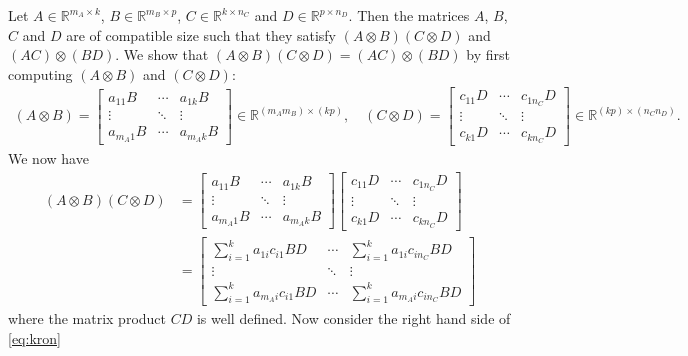 Let $A\in \mathbb{R}^{m_{A}\times k}$, $B\in \mathbb{R}^{m_B\times p}$, $C\in \mathbb{R}^{k\times n_{C}}$ and $D\in \mathbb{R}^{p\times n_{D}}$. Then the matrices $A$, $B$, $C$ and $D$ are of  compatible size such that they satisfy $(A\otimes B)(C\otimes D)$ and $(AC)\otimes (BD)$. We show that $(A\otimes B)(C\otimes D) = (AC)\otimes (BD)$ by first computing $  (A\otimes B)$ and $  (C\otimes D)$:
\begin{align*}
  (A\otimes B) = \begin{bmatrix}
a_{11}B & \cdots & a_{1k}B\\
\vdots & \ddots & \vdots\\
a_{m_{A}1}B & \cdots & a_{m_{A}k}B
\end{bmatrix}
\in \mathbb{R}^{(m_{A}m_{B})\times (kp)},\quad (C\otimes D) = \begin{bmatrix}
c_{11}D & \cdots & c_{1n_{C}}D\\
\vdots & \ddots & \vdots\\
c_{k1}D & \cdots & c_{kn_{C}}D
\end{bmatrix}
\in \mathbb{R}^{(kp)\times (n_{C}n_{D})}.
\end{align*}
We now have
\begin{align*}
  (A\otimes B)(C\otimes D) &= \begin{bmatrix}
a_{11}B & \cdots & a_{1k}B\\
\vdots & \ddots & \vdots\\
a_{m_{A}1}B & \cdots & a_{m_{A}k}B
\end{bmatrix}
\begin{bmatrix}
c_{11}D & \cdots & c_{1n_{C}}D\\
\vdots & \ddots & \vdots\\
c_{k1}D & \cdots & c_{kn_{C}}D
\end{bmatrix}\\
 &= \begin{bmatrix}
\sum\limits^{k}_{i = 1}a_{1i}c_{i1}BD & \cdots & \sum\limits^{k}_{i = 1}a_{1i}c_{in_{C}}BD\\
\vdots & \ddots & \vdots\\
\sum\limits^{k}_{i = 1}a_{m_{A}i}c_{i1}BD & \cdots & \sum\limits^{k}_{i = 1}a_{m_{A}i}c_{in_{C}}BD
\end{bmatrix}
\end{align*}
where the matrix product $CD$ is well defined. Now consider the right hand side of \eqref{eq:kron}
